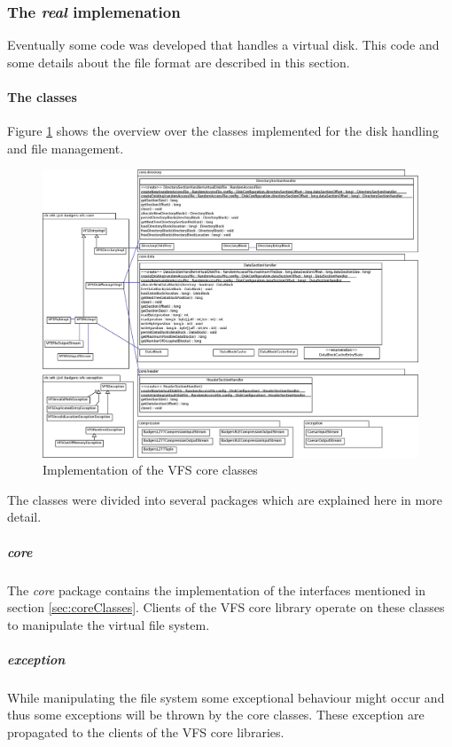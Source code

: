 \subsubsection{The \emph{real} implemenation}

Eventually some code was developed  that handles a virtual disk. This code and
some details about the file format are described in this section.

\paragraph{The classes}

Figure \ref{fig:vfs_impl_classes} shows the overview over the classes
implemented for the disk handling and file management.


\begin{figure}[h!]
\centering
\includegraphics[width=1\textwidth]{figures/vfs_impl_classes.eps}
\caption{Implementation of the VFS core classes}
\label{fig:vfs_impl_classes}
\end{figure}

The classes were divided into several packages which are explained here in more
detail.

\subparagraph{core}
The \textit{core} package contains the implementation of the interfaces
mentioned in section \ref{sec:coreClasses}. Clients of the VFS core library operate on these
classes to manipulate the virtual file system.

\subparagraph{exception}
While manipulating the file system some exceptional behaviour might occur and
thus some exceptions will be thrown by the core classes. These exception are
propagated to the clients of the VFS core libraries.

